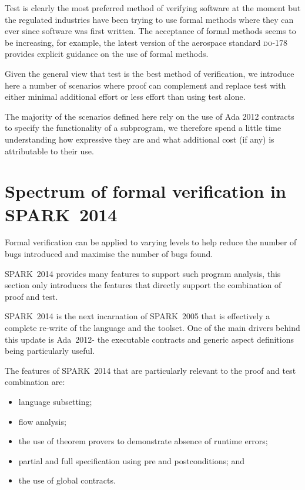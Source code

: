 \documentclass{llncs}
\newcommand{\DO}{\textsc{do-178}\xspace}
\newcommand{\oldspark}{SPARK~2005\xspace}
\newcommand{\newspark}{SPARK~2014\xspace}
\newcommand{\adatwtw}{Ada~2012\xspace}
\begin{document}
Test is clearly the most preferred method of verifying software at the
moment but the regulated industries have been trying to use formal
methods where they can ever since software was first written. The
acceptance of formal methods seems to be increasing, for example, the
latest version of the aerospace standard \DO provides explicit
guidance on the use of formal methods.

Given the general view that test is the best method of verification,
we introduce here a number of scenarios where proof can complement and
replace test with either minimal additional effort or less effort than
using test alone.

The majority of the scenarios defined here rely on the use of Ada 2012
contracts to specify the functionality of a subprogram, we therefore
spend a little time understanding how expressive they are and what
additional cost (if any) is attributable to their use.


\section{Spectrum of formal verification in \newspark}

Formal verification can be applied to varying levels to help reduce
the number of bugs introduced and maximise the number of bugs found.

\newspark provides many features to support such program analysis,
this section only introduces the features that directly support the
combination of proof and test.

\newspark is the next incarnation of \oldspark \cite{sparkbook2012}
that is effectively a complete re-write of the language and the
toolset. One of the main drivers behind this update is \adatwtw - the
executable contracts and generic aspect definitions being particularly
useful.

The features of \newspark that are particularly relevant to the proof
and test combination are:
\begin{itemize}
\item language subsetting;
\item flow analysis;
\item the use of theorem provers to demonstrate absence of runtime
  errors;
\item partial and full specification using pre and postconditions; and
\item the use of global contracts.
\end{itemize}
\end{document}
